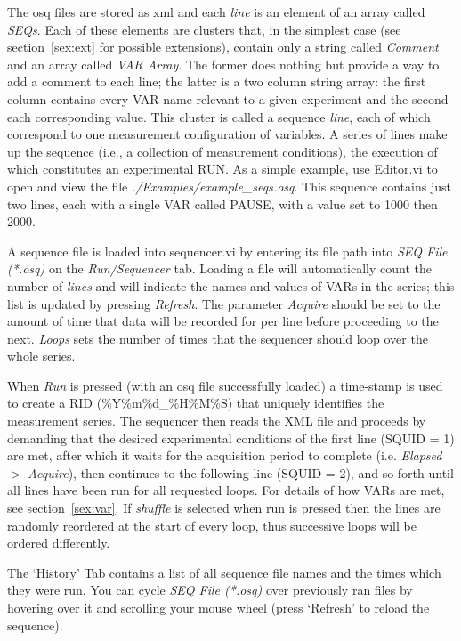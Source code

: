 \documentclass[10pt,a4paper]{article}
\begin{document}
The osq files are stored as xml and each \emph{line} is an element of an array called \emph{SEQs}.  Each of these elements are clusters that, in the simplest case (see section~\ref{sex:ext} for possible extensions), contain only a string called \emph{Comment} and an array called \emph{VAR Array}. The former does nothing but provide a way to add a comment to each line; the latter is a two column string array: the first column contains every VAR name relevant to a given experiment and the second each corresponding value.  This cluster is called  a sequence \emph{line}, each of which correspond to one measurement configuration of variables.  A series of lines make up the sequence (i.e., a collection of measurement conditions), the execution of which constitutes an experimental RUN.  As a simple example, use Editor.vi to open and view the file \emph{./Examples/example\_seqs.osq}.  This sequence contains just two lines, each with a single VAR called PAUSE, with a value set to 1000 then 2000.

A sequence file is loaded into sequencer.vi by entering its file path into  \emph{SEQ File (*.osq)} on the \emph{Run/Sequencer} tab.  Loading a file will automatically count the number of \emph{lines} and will indicate the names and values of VARs in the series; this list is updated by pressing \emph{Refresh}.  The parameter \emph{Acquire} should be set to the amount of time that data will be recorded for per line before proceeding to the next. \emph{Loops} sets the number of times that the sequencer should loop over the whole series. 

When \emph{Run} is pressed (with an osq file successfully loaded) a time-stamp is used to create a RID (\%Y\%m\%d\_\%H\%M\%S) that uniquely identifies the measurement series. The sequencer then reads the XML file and proceeds by demanding that the desired experimental conditions of the first line (SQUID = 1) are met, after which it waits for the acquisition period to complete (i.e. \emph{Elapsed} $>$ \emph{Acquire}), then continues to the following line (SQUID = 2), and so forth until all lines have been run for all requested loops.  For details of how VARs are met, see section~\ref{sex:var}.  If \emph{shuffle} is selected when run is pressed then the lines are randomly reordered at the start of every loop, thus successive loops will be ordered differently.

The `History' Tab contains a list of all sequence file names and the times which they were run.  You can cycle \emph{SEQ File (*.osq)} over previously ran files by hovering over it and scrolling your mouse wheel (press `Refresh' to reload the sequence).
\end{document}
